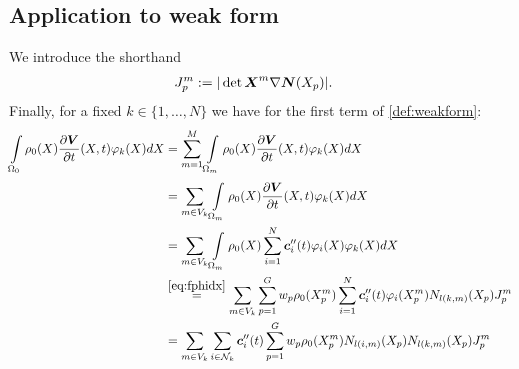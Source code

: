 \subsection{Application to weak form}
We introduce the shorthand
\begin{align}
	J^m_p &:= |\det \boldsymbol{X}^m\nabla\boldsymbol{N}(X_p)|.\label{def:jacshorthand}
\end{align}
Finally, for a fixed $k\in\{1,\ldots, N\}$ we have for the first term of \eqref{def:weakform}:
\begin{align*}
	\intor \rho_0(X)\d{\vV}{t}(X,t)\varphi_k(X)dX
		&= \suml{m=1}{M}\intl{\Omega_m}{} \rho_0(X)\d{\vV}{t}(X,t)\varphi_k(X)dX\\
		&= \sumvk\intl{\Omega_m}{} \rho_0(X)\d{\vV}{t}(X,t)\varphi_k(X)dX\\  		
		&= \sumvk\intl{\Omega_m}{} \rho_0(X)\sumi \vc_i''(t)\varphi_i(X)\varphi_k(X)dX\\
		&\re{eq:fphidx} \sumvk\sumgp w_p \rho_0(\pmp)\sumi \vc_i''(t)\varphi_i(\pmp) N_{l(k,m)}(X_p)\jmp\\
		&= \sumvk\sumnk \vc_i''(t)\sumgp w_p \rho_0(\pmp)N_{l(i,m)}(X_p) N_{l(k,m)}(X_p)\jmp
\end{align*}

